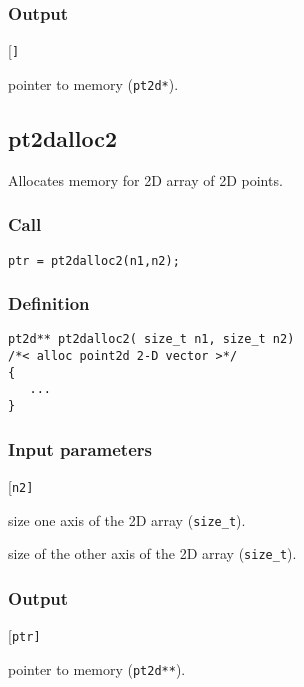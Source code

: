 \subsubsection*{Output}
\begin{desclist}{\tt }{\quad}[\tt ]
   \setlength\itemsep{0pt}
   \item[ptr] pointer to memory (\texttt{pt2d*}).
\end{desclist}




\subsection{{pt2dalloc2}}
Allocates memory for 2D array of 2D points.

\subsubsection*{Call}
\begin{verbatim}ptr = pt2dalloc2(n1,n2);\end{verbatim}

\subsubsection*{Definition}
\begin{verbatim}
pt2d** pt2dalloc2( size_t n1, size_t n2)
/*< alloc point2d 2-D vector >*/
{
   ...
}
\end{verbatim}

\subsubsection*{Input parameters}
\begin{desclist}{\tt }{\quad}[\tt n2]
   \setlength\itemsep{0pt}
   \item[n1]	size one axis of the 2D array (\texttt{size\_t}).
   \item[n2]	size of the other axis of the 2D array (\texttt{size\_t}).
\end{desclist}

\subsubsection*{Output}
\begin{desclist}{\tt }{\quad}[\tt ptr]
   \setlength\itemsep{0pt}
   \item[ptr] pointer to memory (\texttt{pt2d**}).
\end{desclist}





